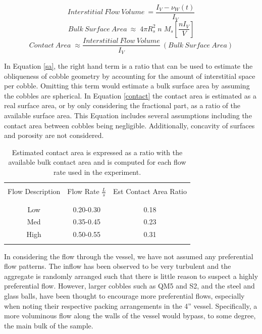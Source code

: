 \begin{equation}\label{flowDisp}
 Interstitial\:Flow\:Volume\:=\frac{I_{V}-\nu_{W}(t)}{I_{V}}
\end{equation}
\begin{equation}\label{sa}
Bulk\:Surface\:Area\:\approx\;4\pi R_{s}^{2}\;n\;M_{s}\left[\frac{nI_{V}}{V}\right]
\end{equation}
\begin{equation}\label{contact}
 Contact\:Area\;\approx\frac{Interstitial\:Flow\:Volume}{I_{V}}\:(Bulk\:Surface\:Area)
\end{equation}

In Equation \ref{sa}, the right hand term is a ratio that can be used to estimate the obliqueness of cobble geometry by accounting for the amount of interstitial space per cobble. Omitting this term would estimate a bulk surface area by assuming the cobbles are spherical. In Equation \ref{contact} the contact area is estimated as a real surface area, or by only considering the fractional part, as a ratio of the available surface area. This Equation includes several assumptions including the contact area between cobbles being negligible. Additionally, concavity of surfaces and porosity are not considered. 

\begin{table}[h] 
\centering                           
\caption[Contact Area Ratios]{Estimated contact area is expressed as a ratio with the available bulk contact area and is computed for each flow rate used in the experiment.\label{contactT}} 
\begin{tabular}{c c c}           
\\[1ex] 
\hline\hline
\\             
Flow Description & Flow Rate $\frac{L}{s}$ & Est Contact Area Ratio\\
\\
\hline
\\
Low & 0.20-0.30 & 0.18\\
Med & 0.35-0.45 & 0.23\\
High & 0.50-0.55 & 0.31\\
\\
\hline\hline
\end{tabular}
\label{tab:matrix}
\end{table}

In considering the flow through the vessel, we have not assumed any preferential flow patterns. The inflow has been observed to be very turbulent and the aggregate is randomly arranged such that there is little reason to suspect a highly preferential flow. However, larger cobbles such as QM5 and S2, and the steel and glass balls, have been thought to encourage more preferential flows, especially when noting their respective packing arrangements in the 4'' vessel. Specifically, a more voluminous flow along the walls of the vessel would bypass, to some degree, the main bulk of the sample. 

